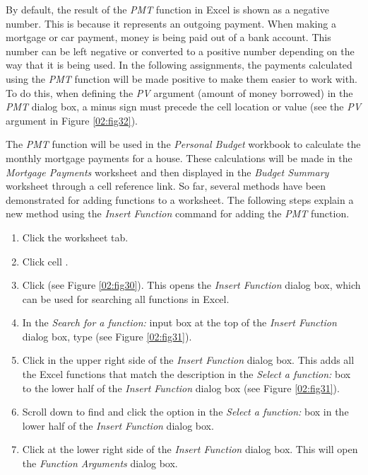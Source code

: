 By default, the result of the \textit{PMT} function in Excel is shown as a negative number. This is because it represents an outgoing payment. When making a mortgage or car payment, money is being paid out of a bank account. This number can be left negative or converted to a positive number depending on the way that it is being used. In the following assignments, the payments calculated using the \textit{PMT} function will be made positive to make them easier to work with. To do this, when defining the \textit{PV} argument (amount of money borrowed) in the \textit{PMT} dialog box, a minus sign must precede the cell location or value (see the \textit{PV} argument in Figure \ref{02:fig32}).

The \textit{PMT} function will be used in the \textit{Personal Budget} workbook to calculate the monthly mortgage payments for a house. These calculations will be made in the \textit{Mortgage Payments} worksheet and then displayed in the \textit{Budget Summary} worksheet through a cell reference link. So far, several methods have been demonstrated for adding functions to a worksheet. The following steps explain a new method using the \textit{Insert Function} command for adding the \textit{PMT} function.

\begin{enumerate}
	\item Click the  worksheet tab.
	\item Click cell .
	\item Click  (see Figure \ref{02:fig30}). This opens the \textit{Insert Function} dialog box, which can be used for searching all functions in Excel.
	\item In the \textit{Search for a function:} input box at the top of the \textit{Insert Function} dialog box, type  (see Figure \ref{02:fig31}). 
	\item Click  in the upper right side of the \textit{Insert Function} dialog box. This adds all the Excel functions that match the description in the \textit{Select a function:} box to the lower half of the \textit{Insert Function} dialog box (see Figure \ref{02:fig31}).
	\item Scroll down to find and click the  option in the \textit{Select a function:} box in the lower half of the \textit{Insert Function} dialog box.
	\item Click  at the lower right side of the \textit{Insert Function} dialog box. This will open the \textit{Function Arguments} dialog box.
\end{enumerate}

